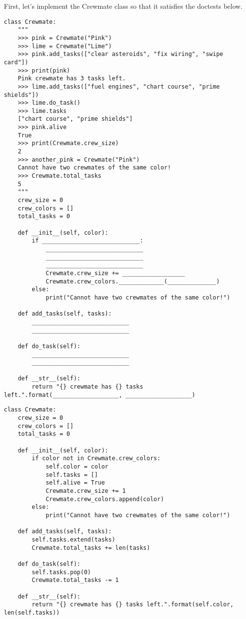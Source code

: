 \question First, let's implement the Crewmate class so that it satisfies the doctests below.
\begin{lstlisting}
class Crewmate:
    """
    >>> pink = Crewmate("Pink")
    >>> lime = Crewmate("Lime")
    >>> pink.add_tasks(["clear asteroids", "fix wiring", "swipe card"])
    >>> print(pink)
    Pink crewmate has 3 tasks left.
    >>> lime.add_tasks(["fuel engines", "chart course", "prime shields"])
    >>> lime.do_task()
    >>> lime.tasks
    ["chart course", "prime shields"]
    >>> pink.alive
    True
    >>> print(Crewmate.crew_size)
    2
    >>> another_pink = Crewmate("Pink")
    Cannot have two crewmates of the same color!
    >>> Crewmate.total_tasks
    5
    """
    crew_size = 0
    crew_colors = []
    total_tasks = 0
    
    def __init__(self, color):
        if ____________________________:
            ____________________________
            ____________________________
            ____________________________
            Crewmate.crew_size += __________________
            Crewmate.crew_colors._____________(______________)
        else:
            print("Cannot have two crewmates of the same color!")
            
    def add_tasks(self, tasks):
        ____________________________
        ____________________________
    
    def do_task(self):
        ____________________________
        ____________________________
    
    def __str__(self):
        return "{} crewmate has {} tasks left.".format(___________________, ___________________)
\end{lstlisting}
\begin{solution}
\begin{lstlisting}
class Crewmate:
    crew_size = 0
    crew_colors = []
    total_tasks = 0
    
    def __init__(self, color):
        if color not in Crewmate.crew_colors:
            self.color = color
            self.tasks = []
            self.alive = True
            Crewmate.crew_size += 1
            Crewmate.crew_colors.append(color)
        else:
            print("Cannot have two crewmates of the same color!")
            
    def add_tasks(self, tasks):
        self.tasks.extend(tasks)
        Crewmate.total_tasks += len(tasks)
    
    def do_task(self):
        self.tasks.pop(0)
        Crewmate.total_tasks -= 1
    
    def __str__(self):
        return "{} crewmate has {} tasks left.".format(self.color, len(self.tasks))
\end{lstlisting}
\end{solution}

